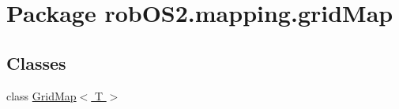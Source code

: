 \hypertarget{namespacerob_o_s2_1_1mapping_1_1grid_map}{
\section{Package robOS2.mapping.gridMap}
\label{namespacerob_o_s2_1_1mapping_1_1grid_map}
}
\subsection*{Classes}
\begin{DoxyCompactItemize}
\item 
class \hyperlink{classrob_o_s2_1_1mapping_1_1grid_map_1_1_grid_map_3_01_t_01_4}{GridMap$<$ T $>$}
\end{DoxyCompactItemize}
